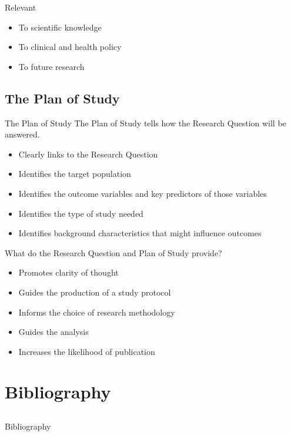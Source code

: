 \documentclass[14pt]{beamer}
\begin{document}
\begin{frame}{Relevant}
\begin{itemize}
\item To scientific knowledge
\item To clinical and health policy
\item To future research
\end{itemize}
\end{frame}

\subsection{The Plan of Study}

\begin{frame}{The Plan of Study}
The Plan of Study tells how the Research Question will be answered.
\begin{itemize}
\item Clearly links to the Research Question
\item Identifies the target population
\item Identifies the outcome variables and key predictors of those variables
\item Identifies the type of study needed
\item Identifies background characteristics that might influence outcomes
\end{itemize}
\end{frame}

\begin{frame}{What do the Research Question and Plan of Study provide?}
\begin{itemize}
\item Promotes clarity of thought
\item Guides the production of a study protocol
\item Informs the choice of research methodology
\item Guides the analysis
\item Increases the likelihood of publication
\end{itemize}
\end{frame}

\section{Bibliography}

\subsection*{}

\begin{frame}[allowframebreaks]{Bibliography}


\end{frame}
\end{document}
